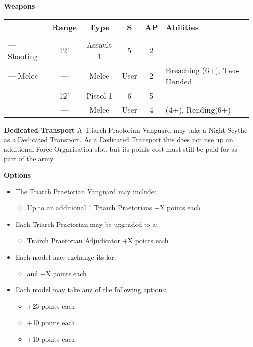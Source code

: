 \begin{minipage}[t]{0.72\textwidth}
	\vspace*{2em}
	\textbf{Weapons}
	
	\begin{tabular}{m{95 pt} *{4}{c} >{\raggedright\arraybackslash}p{130pt}}
		& Range & Type & S & AP & Abilities \\
		\hline
		\quickref{Rod of Covenant} &  &  &  &  & \\
		— Shooting & 12" & Assault 1 & 5 & 2 & — \\
		— Melee & — & Melee & User & 2 & Breaching (6+), Two-Handed \\
		\quickref{Particle Caster} & 12" & Pistol 1 & 6 & 5 & \\
		\quickref{Voidblade} & — & Melee & User & 4 & \quickref{Entropic Strike} (4+), Rending(6+) \\
	\end{tabular}
	
	\vspace*{2em}
	\textbf{Dedicated Transport}
	A Triarch Praetorian Vanguard may take a Night Scythe as a Dedicated Transport. As a Dedicated Transport this does not use up an additional Force Organisation slot, but its points cost must still be paid for as part of the army.
	
	\vspace*{2em}
	\textbf{Options}
	\begin{itemize}
		\item The Triarch Praetorian Vanguard may include:
		\begin{itemize}
			\item Up to an additional 7 Triarch Praetorians \dotfill +X points each
		\end{itemize}
		\item Each Triarch Praetorian may be upgraded to a:
		\begin{itemize}
			\item Trairch Praetorian Adjudicator \dotfill +X points each
		\end{itemize}
		\item Each model may exchange its  for:
		\begin{itemize}
			\item {} and  \dotfill +X points each
		\end{itemize}
		\item Each model may take any of the following options:
		\begin{itemize}
			\item {} \dotfill +25 points each
			\item {} \dotfill +10 points each
			\item {} \dotfill +10 points each
		\end{itemize}
	\end{itemize}
\end{minipage}
